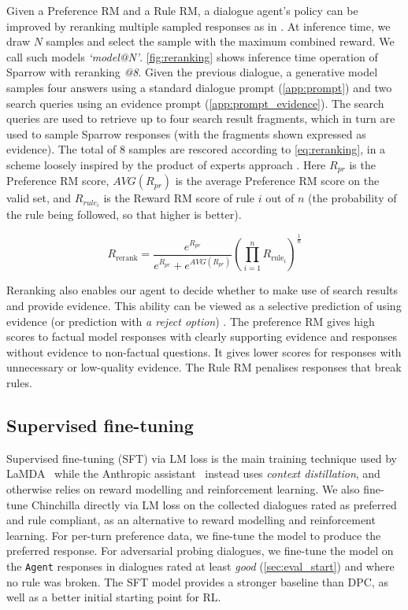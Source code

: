 Given a Preference RM and a Rule RM, a dialogue agent's policy can be improved by reranking multiple sampled responses as in \citet{thoppilan2022lamda, askell2021general, menick2022teaching}.  At inference time, we draw $N$ samples and select the sample with the maximum combined reward. We call such models \textit{`model@N'}. 
\ref{fig:reranking} shows inference time operation of Sparrow with reranking \emph{@8}. Given the previous dialogue, a generative model samples four answers using a standard dialogue prompt (\ref{app:prompt}) and two search queries using an evidence prompt (\ref{app:prompt_evidence}). The search queries are used to retrieve up to four search result fragments, which in turn are used to sample Sparrow responses (with the fragments shown expressed as evidence). The total of 8 samples are rescored according to \ref{eq:reranking}, in a scheme loosely inspired by the product of experts approach \citep{productofexperts}. Here $R_{pr}$ is the Preference RM score, $AVG(R_{pr})$ is the average Preference RM score on the valid set, and $R_{rule_i}$ is the Reward RM score of rule $i$ out of $n$ (the probability of the rule being followed, so that higher is better).

\begin{equation}
\label{eq:reranking}
  R_{\text{rerank}} = \frac{e^{R_{pr}}}{e^{R_{pr}} + e^{AVG(R_{pr})}}  \left( \prod _{i=1}^{n}R_{\text{rule}_{i}} \right)^{\frac{1}{n}}
\end{equation}

Reranking also enables our agent to decide whether to make use of search results and provide evidence. This ability can be viewed as a selective prediction of using evidence (or prediction with {\it a reject option}) \citep{el2010foundations, geifman2017selective, geifman2019selectivenet, kamath2020selective}. The preference RM gives high scores to factual model responses with clearly supporting evidence and responses without evidence to non-factual questions. It gives lower scores for responses with unnecessary or low-quality evidence. The Rule RM penalises responses that break rules.

\subsection{Supervised fine-tuning} \label{sec:sft}

Supervised fine-tuning (SFT) via LM loss is the main training technique used by LaMDA~\citep{thoppilan2022lamda} while the Anthropic assistant~\citep{bai2022training} instead uses \emph{context distillation}, and otherwise relies on reward modelling and reinforcement learning. We also fine-tune Chinchilla directly via LM loss on the collected dialogues rated as preferred and rule compliant, as an alternative to reward modelling and reinforcement learning. For per-turn preference data, we fine-tune the model to produce the preferred response. For adversarial probing dialogues, we fine-tune the model on the \texttt{Agent} responses in dialogues rated at least \emph{good} (\ref{sec:eval_start}) and where no rule was broken. The SFT model provides a stronger baseline than DPC, as well as a better initial starting point for RL.


